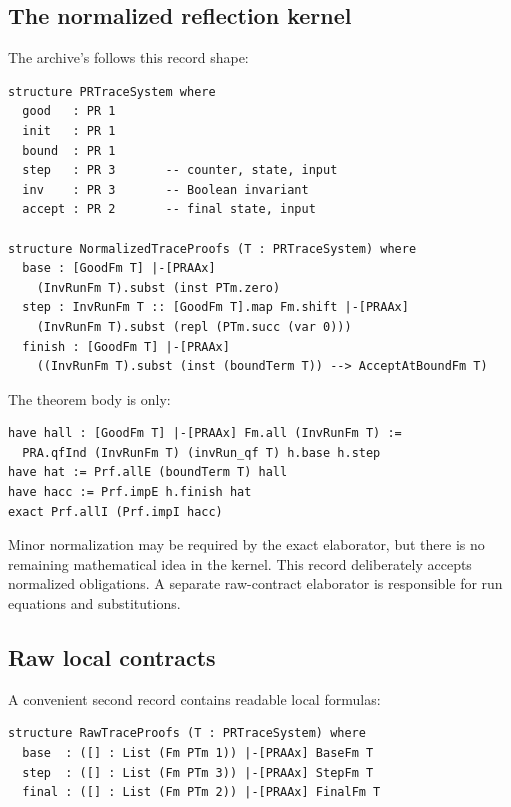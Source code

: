\subsection{The normalized reflection kernel}

The archive's  follows this record shape:

\begin{lstlisting}[language={}] 
structure PRTraceSystem where
  good   : PR 1
  init   : PR 1
  bound  : PR 1
  step   : PR 3       -- counter, state, input
  inv    : PR 3       -- Boolean invariant
  accept : PR 2       -- final state, input

structure NormalizedTraceProofs (T : PRTraceSystem) where
  base : [GoodFm T] |-[PRAAx]
    (InvRunFm T).subst (inst PTm.zero)
  step : InvRunFm T :: [GoodFm T].map Fm.shift |-[PRAAx]
    (InvRunFm T).subst (repl (PTm.succ (var 0)))
  finish : [GoodFm T] |-[PRAAx]
    ((InvRunFm T).subst (inst (boundTerm T)) --> AcceptAtBoundFm T)
\end{lstlisting}

The theorem body is only:

\begin{lstlisting}[language={}] 
have hall : [GoodFm T] |-[PRAAx] Fm.all (InvRunFm T) :=
  PRA.qfInd (InvRunFm T) (invRun_qf T) h.base h.step
have hat := Prf.allE (boundTerm T) hall
have hacc := Prf.impE h.finish hat
exact Prf.allI (Prf.impI hacc)
\end{lstlisting}

Minor  normalization may be required by the exact elaborator, but there is no remaining mathematical idea in the kernel.  This record deliberately accepts normalized obligations.  A separate raw-contract elaborator is responsible for run equations and substitutions.

\subsection{Raw local contracts}

A convenient second record contains readable local formulas:

\begin{lstlisting}[language={}] 
structure RawTraceProofs (T : PRTraceSystem) where
  base  : ([] : List (Fm PTm 1)) |-[PRAAx] BaseFm T
  step  : ([] : List (Fm PTm 3)) |-[PRAAx] StepFm T
  final : ([] : List (Fm PTm 2)) |-[PRAAx] FinalFm T
\end{lstlisting}

